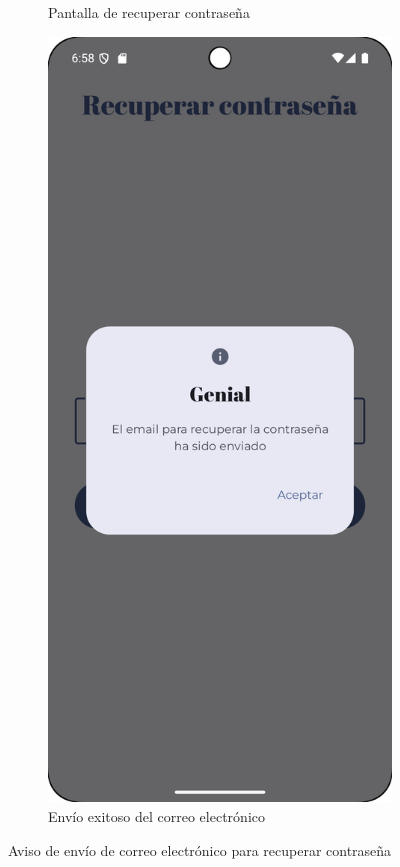 \begin{figure}[H]
\begin{subfigure}[b]{0.3\textwidth}
      \caption{Pantalla de recuperar contraseña}
      \label{fig:reset-password}
    \end{subfigure}
    \hfill
    \begin{subfigure}[b]{0.3\textwidth}
      \includegraphics[width=\textwidth]{./img/manual/send_email_success.png}
      \caption{Envío exitoso del correo electrónico}
      \label{fig:reset-password-succeeds}
    \end{subfigure}
    \hfill
    \caption{Aviso de envío de correo electrónico para recuperar contraseña}
    \label{fig:reset-password}
\end{figure}

